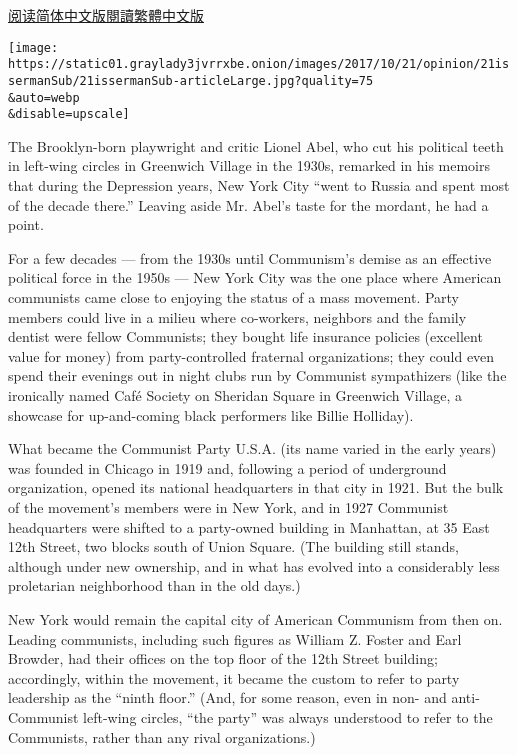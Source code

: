 \href{http://cn.nytimes3xbfgragh.onion/opinion/20171023/new-york-american-communism/}{阅读简体中文版}\href{http://cn.nytimes3xbfgragh.onion/opinion/20171023/new-york-american-communism/zh-hant/}{閱讀繁體中文版}

\texttt{[image: https://static01.graylady3jvrrxbe.onion/images/2017/10/21/opinion/21issermanSub/21issermanSub-articleLarge.jpg?quality=75\\\&auto=webp\\\&disable=upscale]}

The Brooklyn-born playwright and critic Lionel Abel, who cut his
political teeth in left-wing circles in Greenwich Village in the 1930s,
remarked in his memoirs that during the Depression years, New York City
``went to Russia and spent most of the decade there.'' Leaving aside Mr.
Abel's taste for the mordant, he had a point.

For a few decades --- from the 1930s until Communism's demise as an
effective political force in the 1950s --- New York City was the one
place where American communists came close to enjoying the status of a
mass movement. Party members could live in a milieu where co-workers,
neighbors and the family dentist were fellow Communists; they bought
life insurance policies (excellent value for money) from
party-controlled fraternal organizations; they could even spend their
evenings out in night clubs run by Communist sympathizers (like the
ironically named Café Society on Sheridan Square in Greenwich Village, a
showcase for up-and-coming black performers like Billie Holliday).

What became the Communist Party U.S.A. (its name varied in the early
years) was founded in Chicago in 1919 and, following a period of
underground organization, opened its national headquarters in that city
in 1921. But the bulk of the movement's members were in New York, and in
1927 Communist headquarters were shifted to a party-owned building in
Manhattan, at 35 East 12th Street, two blocks south of Union Square.
(The building still stands, although under new ownership, and in what
has evolved into a considerably less proletarian neighborhood than in
the old days.)

New York would remain the capital city of American Communism from then
on. Leading communists, including such figures as William Z. Foster and
Earl Browder, had their offices on the top floor of the 12th Street
building; accordingly, within the movement, it became the custom to
refer to party leadership as the ``ninth floor.'' (And, for some reason,
even in non- and anti-Communist left-wing circles, ``the party'' was
always understood to refer to the Communists, rather than any rival
organizations.)

